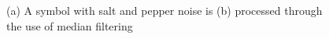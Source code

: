 \begin{figure}[h]
        \centering
        \begin{subfigure}[b]{0.3\textwidth}
                \centering
                \caption{}
                \label{fig:modelsymbol}
        \end{subfigure}
        \begin{subfigure}[b]{0.3\textwidth}
                \centering
                \caption{}
                \label{fig:mf123}
        \end{subfigure}
        \caption[Example output of median filtering.]{(a) A symbol with salt and pepper noise is (b) processed through the use of median filtering}
        \label{fig:mf}
\end{figure}

